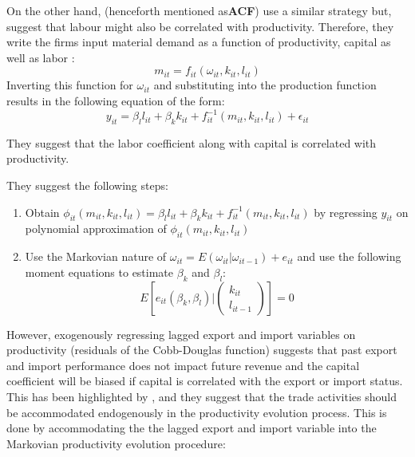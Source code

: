 \documentclass[12pt]{article}
\begin{document}
On the other hand, \textcite{ackerberg2006structural} (henceforth mentioned as\textbf{ACF}) use a
similar strategy but, suggest that labour might also be
correlated with productivity. Therefore, they write  the firms input
material demand as a function of productivity, capital as well as
labor : 
$$ m_{it} = f_{it}(\omega_{it}, k_{it}, l_{it})$$
Inverting this function for $\omega_{it}$ and substituting into the
production function results in the following 
equation of the form:
\begin{equation}
y_{it} = \beta_{l}l_{it} + \beta_k k_{it} + f_{it}^{-1}(m_{it},
k_{it}, l_{it})+ \epsilon_{it}
\end{equation}


They suggest that the  labor coefficient along with capital  is correlated with
productivity. 

They suggest the following steps:
\begin{enumerate}
\item Obtain $\phi_{it}(m_{it}, k_{it}, l_{it}) = \beta_{l}l_{it} + \beta_k k_{it} + f_{it}^{-1}(m_{it},
k_{it}, l_{it})$ by regressing $y_{it}$ on polynomial approximation of
$\phi_{it}(m_{it}, k_{it}, l_{it})$
\item Use the Markovian nature of $\omega_{it} =
  E(\omega_{it}|\omega_{it-1}) + e_{it}$
and use the following moment equations to estimate $\beta_{k}$ and
$\beta_{l}$:
\begin{equation}
E[e_{it}(\beta_{k},\beta_{l})|\begin{pmatrix}k_{it}\\ l_{it-1}
\end{pmatrix}
]= 0
\end{equation}
\end{enumerate} 


However, exogenously regressing lagged  export and import variables  on
productivity (residuals of the Cobb-Douglas function) suggests that past
export and import performance  does not impact future revenue and the
capital coefficient will be biased if capital is correlated with the
export or import status.  This has been highlighted by \textcite{de2013detecting}, and
they suggest that the trade activities should be accommodated
endogenously in the productivity evolution process. This is done by
accommodating the the lagged export and import variable into the
Markovian productivity evolution procedure:
\end{document}

